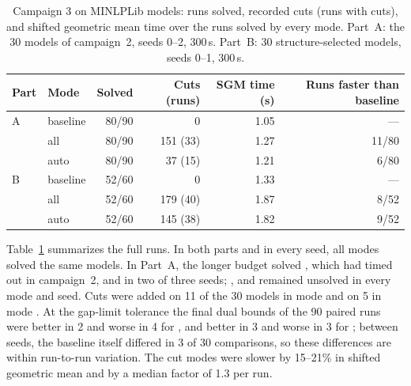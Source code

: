 \begin{table}[t]
\centering\small
\caption{Campaign 3 on MINLPLib models: runs solved, recorded cuts (runs
with cuts), and shifted geometric mean time over the runs solved by every
mode. Part~A: the 30 models of campaign~2, seeds 0--2, 300\,s. Part~B: 30
structure-selected models, seeds 0--1, 300\,s.}\label{tab:campaign3}
\begin{tabular}{@{}llrrrr@{}}
\toprule
Part & Mode & Solved & Cuts (runs) & SGM time (s) & Runs faster than baseline\\
\midrule
A & baseline & 80/90 & 0 & 1.05 & ---\\
  & all      & 80/90 & 151 (33) & 1.27 & 11/80\\
  & auto     & 80/90 & 37 (15) & 1.21 & 6/80\\
\midrule
B & baseline & 52/60 & 0 & 1.33 & ---\\
  & all      & 52/60 & 179 (40) & 1.87 & 8/52\\
  & auto     & 52/60 & 145 (38) & 1.82 & 9/52\\
\bottomrule
\end{tabular}
\end{table}

Table~\ref{tab:campaign3} summarizes the full runs. In both parts and in
every seed, all modes solved the same models. In Part~A, the longer budget
solved , which had timed out in campaign~2, and
 in two of three seeds; ,  and
 remained unsolved in every mode and seed. Cuts were added on
11 of the 30 models in mode  and on 5 in mode . At the
gap-limit tolerance the final dual bounds of the 90 paired runs were
better in 2 and worse in 4 for , and better in 3 and worse in 3
for ; between seeds, the baseline itself differed in 3 of 30
comparisons, so these differences are within run-to-run variation. The cut
modes were slower by 15--21\% in shifted geometric mean and by a median
factor of 1.3 per run.

